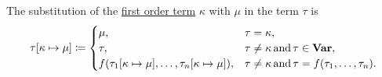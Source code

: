 \begin{definition}
\begin{thmenum}
     The substitution of the \hyperref[def:first_order_syntax/term]{first order term} \( \kappa \) with \( \mu \) in the term \( \tau \) is
    \begin{equation}\label{eq:def:first_order_substitution/term_in_term}
      \tau[\kappa \mapsto \mu] \coloneqq \begin{cases}
        \mu,                                                               &\tau = \kappa, \\
        \tau,                                                              &\tau \neq \kappa \mathop{\text{and}} \tau \in \operatorname{\mathbf{Var}}, \\
        f(\tau_1[\kappa \mapsto \mu], \ldots, \tau_n[\kappa \mapsto \mu]), &\tau \neq \kappa \mathop{\text{and}} \tau = f(\tau_1, \ldots, \tau_n).
      \end{cases}
    \end{equation}


\end{thmenum}
\end{definition}
